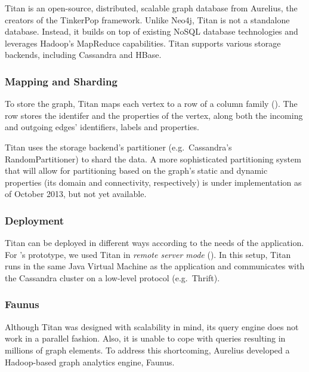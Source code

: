 Titan is an open-source, distributed, scalable graph database from Aurelius, the creators of the TinkerPop framework. Unlike Neo4j, Titan is not a standalone database. Instead, it builds on top of existing NoSQL database technologies and leverages Hadoop's MapReduce capabilities. Titan supports various storage backends, including Cassandra and HBase.

\subsubsection{Mapping and Sharding}

To store the graph, Titan maps each vertex to a row of a column family (). The row stores the identifer and the properties of the vertex, along both the incoming and outgoing edges' identifiers, labels and properties.

Titan uses the storage backend's partitioner (e.g.\ Cassandra's RandomPartitioner) to shard the data. A more sophisticated partitioning system that will allow for partitioning based on the graph's static and dynamic properties (its domain and connectivity, respectively) is under implementation as of October 2013, but not yet available.


\subsubsection{Deployment}

Titan can be deployed in different ways according to the needs of the application. For \iqd{}'s prototype, we used Titan in \textit{remote server mode} (). In this setup, Titan runs in the same Java Virtual Machine as the application and communicates with the Cassandra cluster on a low-level protocol (e.g.\ Thrift).


\subsubsection{Faunus}
\label{faunus}

Although Titan was designed with scalability in mind, its query engine does not work in a parallel fashion. Also, it is unable to cope with queries resulting in millions of graph elements. To address this shortcoming, Aurelius developed a Hadoop-based graph analytics engine, Faunus.

